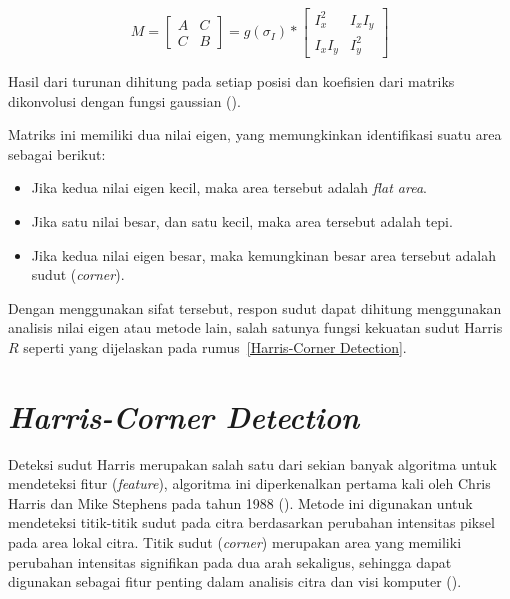\begin{equation}
  M = 
    \begin{bmatrix}
      A & C \\
      C & B
    \end{bmatrix}
    = g(\sigma_{I}) *
      \begin{bmatrix}
        I_{x}^2 & I_{x}I_{y} \\
        I_{x}I_{y} & I_{y}^2
      \end{bmatrix}
  \label{eq:SecondMomentMatrix}
\end{equation}

Hasil dari turunan dihitung pada setiap posisi dan koefisien dari matriks dikonvolusi dengan fungsi gaussian (\cite{Sanchez2018}). 

Matriks ini memiliki dua nilai eigen, yang memungkinkan identifikasi suatu area sebagai berikut:

\begin{itemize}
  \item Jika kedua nilai eigen kecil, maka area tersebut adalah \emph{flat area}.
  \item Jika satu nilai besar, dan satu kecil, maka area tersebut adalah tepi.
  \item Jika kedua nilai eigen besar, maka kemungkinan besar area tersebut adalah sudut (\emph{corner}).
\end{itemize}

Dengan menggunakan sifat tersebut, respon sudut dapat dihitung menggunakan analisis nilai eigen atau metode lain, salah satunya fungsi kekuatan sudut Harris \(R\) seperti yang dijelaskan pada rumus~\ref{Harris-Corner Detection}.

\section{\emph{Harris-Corner Detection}}
  Deteksi sudut Harris merupakan salah satu dari sekian banyak algoritma untuk mendeteksi fitur (\emph{feature}), algoritma ini diperkenalkan pertama kali oleh Chris Harris dan Mike Stephens pada tahun 1988 (\cite{Harris1988}). 
Metode ini digunakan untuk mendeteksi titik-titik sudut pada citra berdasarkan perubahan intensitas piksel pada area lokal citra.
Titik sudut (\emph{corner}) merupakan area yang memiliki perubahan intensitas signifikan pada dua arah sekaligus, sehingga dapat digunakan sebagai fitur penting dalam analisis citra dan visi komputer (\cite{Harris1988}).

